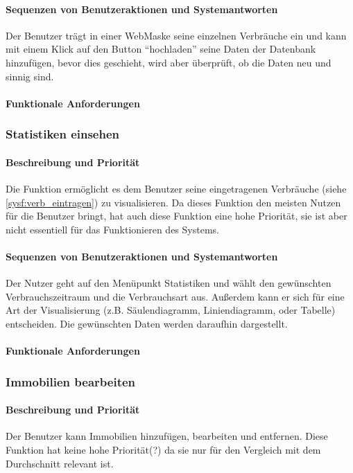 \paragraph{Sequenzen von Benutzeraktionen und Systemantworten}
Der Benutzer trägt in einer WebMaske seine einzelnen Verbräuche ein und kann mit einem Klick auf den Button “hochladen” seine Daten der Datenbank hinzufügen, bevor dies geschieht, wird aber überprüft, ob die Daten neu und sinnig sind.
\paragraph{Funktionale Anforderungen}

\subsubsection{Statistiken einsehen}
\paragraph{Beschreibung und Priorität}
Die Funktion ermöglicht es dem Benutzer seine eingetragenen Verbräuche (siehe \ref{sysf:verb_eintragen}) zu visualisieren. Da dieses Funktion den meisten Nutzen für die Benutzer bringt, hat auch diese Funktion eine hohe Priorität, sie ist aber nicht essentiell für das Funktionieren des Systems.

\paragraph{Sequenzen von Benutzeraktionen und Systemantworten}

Der Nutzer geht auf den Menüpunkt Statistiken und wählt den gewünschten Verbrauchszeitraum und die Verbrauchsart aus. Außerdem kann er sich für eine Art der Visualisierung (z.B. Säulendiagramm, Liniendiagramm, oder Tabelle) entscheiden. Die gewünschten Daten werden daraufhin dargestellt.

\paragraph{Funktionale Anforderungen}

\subsubsection{Immobilien bearbeiten}
\paragraph{Beschreibung und Priorität}
Der Benutzer kann Immobilien hinzufügen,
bearbeiten und entfernen. %
Diese Funktion hat keine hohe Priorität(?) da sie nur für den Vergleich mit dem Durchschnitt relevant ist. 

